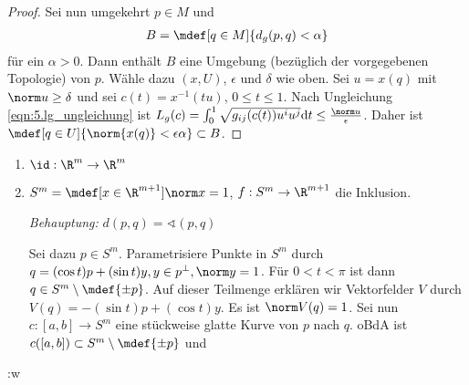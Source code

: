\begin{stz}
\begin{proof}
    Sei nun umgekehrt $p\in M$ und
    \begin{align}
      B = \mdef[q\in M]{d_g(p,q) < \alpha}
      \label{}
    \end{align}
    für ein $\alpha > 0$. Dann enthält $B$ eine Umgebung (bezüglich der
    vorgegebenen Topologie) von $p$. Wähle dazu $(x, U)$, $\epsilon$ und
    $\delta$ wie oben. Sei $u = x(q)$ mit $\norm u \ge \delta$ und sei $c(t) =
    x^{-1}(tu)$, $0 \le t \le 1$. Nach Ungleichung \ref{eqn:5.lg_ungleichung}
    ist $L_g(c) = \int_0^1 \sqrt{g_{ij}(c(t))u^iu^j}\d t \le
    \frac{\norm u}{\epsilon}$. Daher ist $\mdef[q\in U]{\norm{x(q)} <
    \epsilon\alpha} \subset B$.
  \end{proof}

  \begin{bsps}
    \begin{enumerate}
      \item $\id : \R^m \to \R^m$
      \item $S^m = \mdef[x\in \R^{m+1}]{\norm x = 1}$, $f : S^m\to\R^{m+1}$ die
        Inklusion.
        
        \emph{Behauptung:} $d(p,q) = \sphericalangle(p,q)$

        Sei dazu $p\in S^m$. Parametrisiere Punkte in $S^m$ durch $q = (\cos t)p
        + (\sin t)y, y\in p^\perp, \norm y = 1$. Für $0< t < \pi$ ist dann $q\in
        S^m \setminus \mdef{\pm p}$. Auf dieser Teilmenge erklären wir
        Vektorfelder $V$ durch $V(q) = -(\sin t)p + (\cos t)y$. Es ist $\norm
        V(q) = 1$. Sei nun $c:[a,b] \to S^m$ eine stückweise glatte Kurve von
        $p$ nach $q$.
        oBdA ist $c([a,b])\subset S^m\setminus\mdef{\pm p}$ und 
    \end{enumerate}
  \end{bsps}:w
\end{stz}
